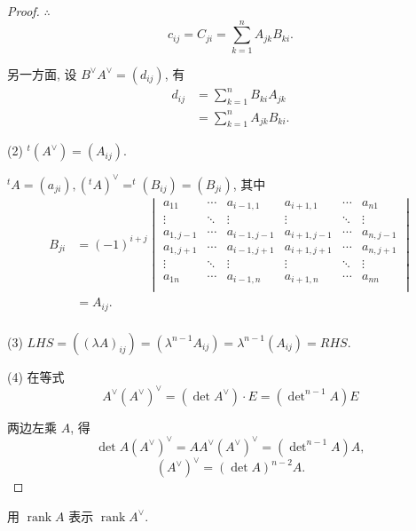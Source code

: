 \documentclass{ctexart}
\begin{document}
\begin{proof}
    $\therefore$
    \[c_{ij}=C_{ji}=\sum\limits_{k=1}^nA_{jk}B_{ki}.\]

    另一方面, 设 $B^\vee A^\vee=(d_{ij})$, 有
    \begin{align*}
        d_{ij} & =\sum\limits_{k=1}^nB_{ki}A_{jk} \\
        & =\sum\limits_{k=1}^nA_{jk}B_{ki}.
    \end{align*}

    (2) $^t(A^\vee)=(A_{ij})$.

    $^tA=(a_{ji}),(^tA)^\vee=^t(B_{ij})=(B_{ji})$, 其中
    \begin{align*}
        B_{ji} & =(-1)^{i+j}\begin{vmatrix}
            a_{11} & \cdots & a_{i-1,1} & a_{i+1,1} & \cdots & a_{n1} \\
            \vdots & \ddots & \vdots & \vdots & \ddots & \vdots \\
            a_{1,j-1} & \cdots & a_{i-1,j-1} & a_{i+1,j-1} & \cdots & a_{n,j-1} \\
            a_{1,j+1} & \cdots & a_{i-1,j+1} & a_{i+1,j+1} & \cdots & a_{n,j+1} \\
            \vdots & \ddots & \vdots & \vdots & \ddots & \vdots \\
            a_{1n} & \cdots & a_{i-1,n} & a_{i+1,n} & \cdots & a_{nn} \\
        \end{vmatrix} \\
        & =A_{ij}. \\
    \end{align*}

    (3) $LHS=((\lambda A)_{ij})=(\lambda^{n-1}A_{ij})=\lambda^{n-1}(A_{ij})=RHS$.

    (4) 在等式
    \[A^\vee(A^\vee)^\vee=(\det A^\vee)\cdot E=(\det\nolimits^{n-1}A)E\]

    两边左乘 $A$, 得
    \[\det A(A^\vee)^\vee=AA^\vee(A^\vee)^\vee=(\det\nolimits^{n-1}A)A,\]
    \[(A^\vee)^\vee=(\det A)^{n-2}A.\]
\end{proof}
\begin{exercise}[3.2]
    用 $\operatorname{rank}A$ 表示 $\operatorname{rank}A^\vee$.
\end{exercise}
\end{document}
